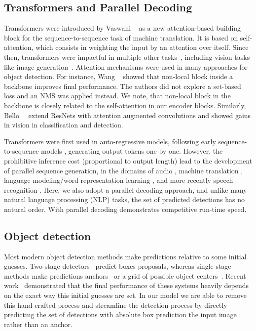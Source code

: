 \subsection{Transformers and Parallel Decoding}

Transformers were introduced by Vaswani \etal~\cite{Vaswani2017AttentionIA} as a new attention-based building block for the sequence-to-sequence task of machine translation.  %
It is based on self-attention, which consists 
in weighting the input by an attention over itself. 
Since then, transformers were impactful in multiple other tasks~\cite{Devlin2019BERTPO,Lscher2019RWTHAS,Radford2019LanguageMA}, including vision tasks like image generation~\cite{Parmar2018ImageT}. Attention mechanisms were used in many approaches for object detection. For instance, Wang \etal~\cite{Wang2017NonlocalNN} showed that non-local block inside a backbone improves final performance. The authors did not explore a set-based loss and an NMS was applied instead. We note, that non-local block in the backbone is closely related to the self-attention in our encoder blocks. Similarly, Bello~\etal~\cite{Bello2019AttentionAC} extend ResNets with attention augmented convolutions and showed gains in vision in classification and detection.

Transformers were first used in auto-regressive models, following early sequence-to-sequence models \cite{sutskever2014sequence}, generating output tokens one by one. However, the prohibitive inference cost (proportional to output length) lead to the development of parallel sequence generation, in the domains of audio \cite{oord2017parallel}, machine translation \cite{Gu2017NonAutoregressiveNM,ghazvininejad2019constant}, language modeling/word representation learning \cite{Devlin2019BERTPO}, and more recently speech recognition \cite{chan2020imputer}. Here, we also adopt a parallel decoding approach, and unlike many natural language processing (NLP) tasks, the set of predicted detections has no natural order. With parallel decoding \detr demonstrates competitive run-time speed.

\subsection{Object detection}

Most modern object detection methods make predictions relative to some initial guesses. Two-stage detectors~\cite{Ren2015FasterRT,Cai2019CascadeRH} predict boxes \wrt proposals, whereas single-stage methods make predictions \wrt anchors~\cite{Lin2017FocalLF} or a grid of possible object centers~\cite{Zhou2019objects,tian2019fcos}. Recent work~\cite{Zhang2019bridging} demonstrated that the final performance of these systems heavily depends on the exact way this initial guesses are set. In our model we are able to remove this hand-crafted process and streamline the detection process by directly predicting the set of detections with absolute box prediction \wrt the input image rather than an anchor.

